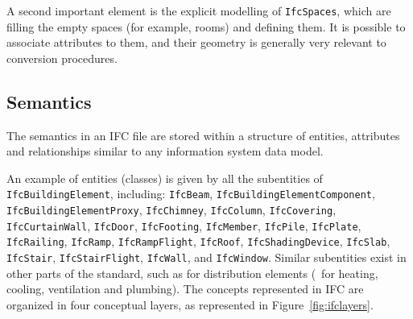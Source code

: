 A second important element is the explicit modelling of \texttt{IfcSpaces}, which are filling the empty spaces (for example, rooms) and defining them.
It is possible to associate attributes to them, and their geometry is generally very relevant to conversion procedures.

\subsection{Semantics}

The semantics in an IFC file are stored within a structure of entities, attributes and relationships similar to any information system data model.

An example of entities (classes) is given by all the subentities of \texttt{Ifc\-Buil\-ding\-E\-le\-ment}, including: \texttt{Ifc\-Beam}, \texttt{Ifc\-Buil\-ding\-E\-le\-ment\-Com\-po\-nent}, \texttt{Ifc\-Buil\-ding\-E\-le\-ment\-Pro\-xy}, \texttt{Ifc\-Chim\-ney}, \texttt{Ifc\-Co\-lumn}, \texttt{Ifc\-Co\-ve\-ring}, \texttt{Ifc\-Cur\-tain\-Wall}, \texttt{Ifc\-Door}, \texttt{Ifc\-Foo\-ting}, \texttt{Ifc\-Mem\-ber}, \texttt{Ifc\-Pile}, \texttt{Ifc\-Plate}, \texttt{Ifc\-Rai\-ling}, \texttt{Ifc\-Ramp}, \texttt{Ifc\-Ramp\-Flight}, \texttt{Ifc\-Roof}, \texttt{Ifc\-Sha\-ding\-De\-vice}, \texttt{Ifc\-Slab}, \texttt{Ifc\-Stair}, \texttt{Ifc\-Stair\-Flight}, \texttt{Ifc\-Wall}, and \texttt{Ifc\-Win\-dow}.
%
Similar subentities exist in other parts of the standard, such as for distribution elements (\eg\ for heating, cooling, ventilation and plumbing).
The concepts represented in IFC are organized in four conceptual layers, as represented in Figure~\ref{fig:ifclayers}.

